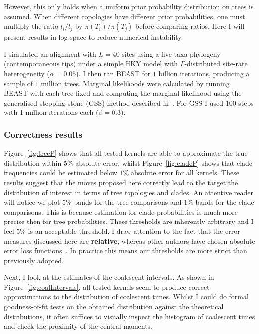 However, this only holds when a uniform prior probability distribution on trees is assumed. 
When different topologies have different prior probabilities, one must multiply the ratio $l_i/l_j$ by $\pi(T_i)/\pi(T_j)$ before comparing ratios.
Here I will present results in log space to reduce numerical instability.

I simulated an alignment with $L = 40$ sites using a five taxa phylogeny (contemporaneous tips) under a simple HKY model with $\Gamma$-distributed site-rate heterogeneity ($\alpha = 0.05$).
I then ran BEAST for $1$ billion iterations, producing a sample of $1$ million trees.
Marginal likelihoods were calculated by running BEAST with each tree fixed and computing the marginal likelihood using the generalised stepping stone (GSS) method described in~\cite{Baele2015}.
For GSS I used $100$ steps with 1 million iterations each ($\beta = 0.3$).

\subsubsection{Correctness results}
\label{sec:correctness}

Figure~\ref{fig:treeP} shows that all tested kernels are able to approximate the true distribution within $5\%$ absolute error, whilst Figure~\ref{fig:cladeP} shows that clade frequencies could be estimated below $1\%$ absolute error for all kernels.
These results suggest that the moves proposed here correctly lead to the target the distribution of interest in terms of tree topologies and clades.
An attentive reader will notice we plot $5\%$ bands for the tree comparisons and $1\%$ bands for the clade comparisons. 
This is because estimation for clade probabilities is much more precise then for tree probabilities.
These thresholds are inherently arbitrary and I feel $5\%$ is an acceptable threshold.
I draw attention to the fact that the error measures discussed here are \textbf{relative}, whereas other authors have chosen absolute error loss functions~\citep{Hoehna2008, Lakner2008}.
In practice this means our thresholds are more strict than previously adopted.

Next, I look at the estimates of the coalescent intervals.
As shown in Figure~\ref{fig:coalIntervals}, all tested kernels seem to produce correct approximations to the distribution of coalescent times.
Whilst I could do formal goodness-of-fit tests on the obtained distribution against the theoretical distributions, it often suffices to visually inspect the histogram of coalescent times and check the proximity of the central moments.%


